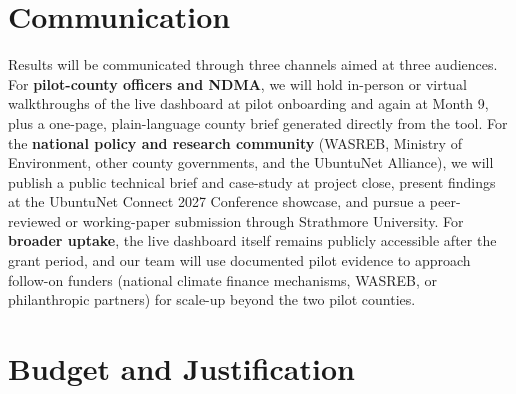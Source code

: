 \documentclass[12pt,a4paper]{article}
\begin{document}
\section{Communication}

Results will be communicated through three channels aimed at three audiences. For \textbf{pilot-county officers and NDMA}, we will hold in-person or virtual walkthroughs of the live dashboard at pilot onboarding and again at Month 9, plus a one-page, plain-language county brief generated directly from the tool. For the \textbf{national policy and research community} (WASREB, Ministry of Environment, other county governments, and the UbuntuNet Alliance), we will publish a public technical brief and case-study at project close, present findings at the UbuntuNet Connect 2027 Conference showcase, and pursue a peer-reviewed or working-paper submission through Strathmore University. For \textbf{broader uptake}, the live dashboard itself remains publicly accessible after the grant period, and our team will use documented pilot evidence to approach follow-on funders (national climate finance mechanisms, WASREB, or philanthropic partners) for scale-up beyond the two pilot counties.

\newpage
\section{Budget and Justification}
\end{document}
